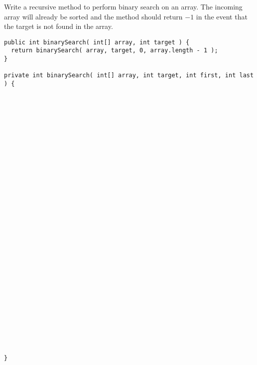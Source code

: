 \documentclass[11pt]{exam}
\begin{document}
\begin{questions}
\newpage
\question[16] Write a recursive method to perform binary search on an array.   The incoming array will already be sorted and the method should return $-1$ in the event that the target is not found in the array.

\begin{verbatim}
public int binarySearch( int[] array, int target ) {
  return binarySearch( array, target, 0, array.length - 1 );
}

private int binarySearch( int[] array, int target, int first, int last ) {
































}	
\end{verbatim}




%

\end{questions}
\end{document}
